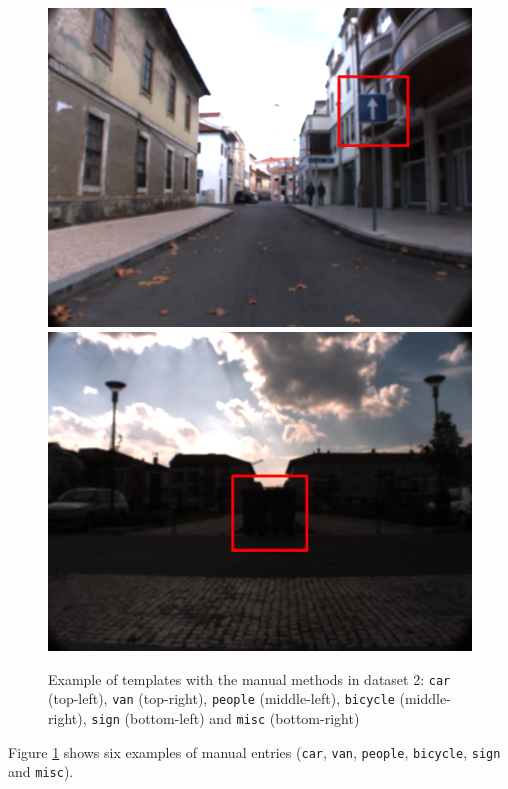 \begin{figure}[htp]
	\includegraphics[width=.49\textwidth]{capresults/imgs/sign3.png}
	\includegraphics[width=.49\textwidth]{capresults/imgs/misc2.png}
	
	\caption{Example of templates with the manual methods in dataset 2:  \texttt{car} (top-left), \texttt{van} (top-right), \texttt{people} (middle-left), \texttt{bicycle} (middle-right), \texttt{sign} (bottom-left) and \texttt{misc} (bottom-right)}
	\label{fig:dataset2results2}
	
\end{figure}

Figure \ref{fig:dataset2results2} shows six examples of manual entries (\texttt{car}, \texttt{van}, \texttt{people}, \texttt{bicycle}, \texttt{sign} and \texttt{misc}).











